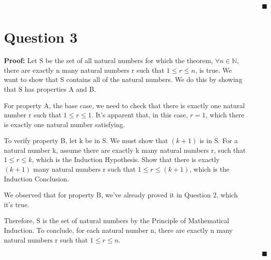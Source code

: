 \documentclass[12pt]{article}
\begin{document}
$\quad \quad \quad \quad \quad \quad \quad \quad \quad \quad \quad \quad \quad \quad \quad \quad \quad \quad \quad \quad \quad \quad \quad \quad \quad \quad \quad \quad \quad \quad \quad \quad \quad \quad \quad \quad \quad \quad  \blacksquare $

\newpage

\section{Question 3}
\textbf{Proof:} Let S be the set of all natural numbers for which the theorem, $\forall n \in \mathbb{N}$, there are exactly n many natural numbers r such that $1 \leq r \leq n$, is true.
We want to show that S contains all of the natural numbers.
We do this by showing that S has properties A and B.

\noindent For property A, the base case, we need to check that there is exactly one natural number r such that $1 \leq r \leq 1$.
It's apparent that, in this case, $r=1$, which there is exactly one natural number satisfying.

\noindent To verify property B, let k be in S. We must show that $(k+1)$ is in S.
For a natural number k, assume there are exactly k many natural numbers r, such that $1 \leq r \leq k$, which is the Induction Hypothesis.
Show that there is exactly $(k+1)$ many natural numbers r such that $1 \leq r \leq (k+1)$, which is the Induction Conclusion.

\noindent We observed that for property B, we've already proved it in Question 2, which it's true.

\noindent Therefore, S is the set of natural numbers by the Principle of Mathematical Induction. To conclude, for each natural number n, there are exactly n many natural numbers r such that $1 \leq r \leq n$.

$\quad \quad \quad \quad \quad \quad \quad \quad \quad \quad \quad \quad \quad \quad \quad \quad \quad \quad \quad \quad \quad \quad \quad \quad \quad \quad \quad \quad \quad \quad \quad \quad \quad \quad \quad \quad \quad \quad  \blacksquare $
\end{document}

